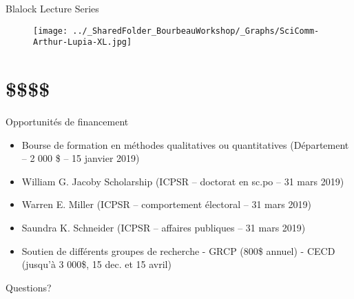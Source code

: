 \documentclass{beamer}
\begin{document}
\begin{frame}{Blalock Lecture Series}

\begin{figure}
    \centering
    \texttt{[image: ../\_SharedFolder\_BourbeauWorkshop/\_Graphs/SciComm-Arthur-Lupia-XL.jpg]}
    \label{fig:my_label3}
\end{figure}
\end{frame}


\section{\$\$\$\$}

\begin{frame}{Opportunités de financement}

\begin{itemize}
    \item Bourse de formation en méthodes qualitatives ou quantitatives (Département -- 2 000 \$ -- 15 janvier 2019)
    \item William G. Jacoby Scholarship (ICPSR -- doctorat en sc.po -- 31 mars 2019)
    \item Warren E. Miller (ICPSR -- comportement électoral -- 31 mars 2019) 
    \item Saundra K. Schneider (ICPSR -- affaires publiques -- 31 mars 2019)
    \item Soutien de différents groupes de recherche \newline
    - GRCP (800\$ annuel) \newline
    - CECD (jusqu'à 3 000\$, 15 dec. et 15 avril) 
\end{itemize}

\end{frame}

\begin{frame}{Questions?}
\end{frame}

  
\end{document}
